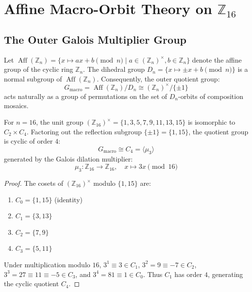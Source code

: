 \section{Affine Macro-Orbit Theory on \texorpdfstring{$\mathbb{Z}_{16}$}{Z16}}
\label{sec:affine-macro-orbits}

\subsection{The Outer Galois Multiplier Group}

Let $\operatorname{Aff}(\mathbb{Z}_n) = \{x \mapsto ax + b \pmod n \mid a \in (\mathbb{Z}_n)^\times, b \in \mathbb{Z}_n\}$ denote the affine group of the cyclic ring $\mathbb{Z}_n$. The dihedral group $D_n = \{x \mapsto \pm x + b \pmod n\}$ is a normal subgroup of $\operatorname{Aff}(\mathbb{Z}_n)$. Consequently, the outer quotient group:
\begin{equation}
\label{eqn:g-macro-def}
G_{\text{macro}} = \operatorname{Aff}(\mathbb{Z}_n) / D_n \cong (\mathbb{Z}_n)^\times / \{\pm 1\}
\end{equation}
acts naturally as a group of permutations on the set of $D_n$-orbits of composition mosaics.

\begin{proposition}
\label{prop:g-macro-c4}
For $n = 16$, the unit group $(\mathbb{Z}_{16})^\times = \{1, 3, 5, 7, 9, 11, 13, 15\}$ is isomorphic to $C_2 \times C_4$. Factoring out the reflection subgroup $\{\pm 1\} = \{1, 15\}$, the quotient group is cyclic of order $4$:
\begin{equation}
\label{eqn:c4-quotient}
G_{\text{macro}} \cong C_4 = \langle \mu_3 \rangle
\end{equation}
generated by the Galois dilation multiplier:
\begin{equation}
\label{eqn:mu3-def}
\mu_3 \colon \mathbb{Z}_{16} \to \mathbb{Z}_{16}, \quad x \mapsto 3x \pmod{16}
\end{equation}
\end{proposition}

\begin{proof}
The cosets of $(\mathbb{Z}_{16})^\times$ modulo $\{1, 15\}$ are:
\begin{enumerate}
    \item $C_0 = \{1, 15\}$ (identity)
    \item $C_1 = \{3, 13\}$
    \item $C_2 = \{7, 9\}$
    \item $C_3 = \{5, 11\}$
\end{enumerate}
Under multiplication modulo $16$, $3^1 \equiv 3 \in C_1$, $3^2 = 9 \equiv -7 \in C_2$, $3^3 = 27 \equiv 11 \equiv -5 \in C_3$, and $3^4 = 81 \equiv 1 \in C_0$. Thus $C_1$ has order $4$, generating the cyclic quotient $C_4$.
\end{proof}

